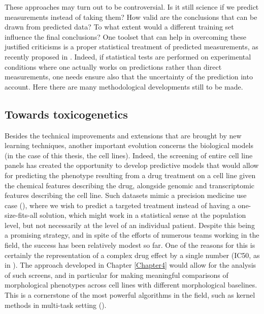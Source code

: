 These approaches may turn out to be controversial. Is it still science if we predict measurements instead of taking them? How valid are the conclusions that can be drawn from predicted data? To what extent would a different training set influence the final conclusions? One toolset that can help in overcoming these justified criticisms is a proper statistical treatment of predicted measurements, as recently proposed in \cite{whitehill2018automatic}. Indeed, if statistical tests are performed on experimental conditions where one actually works on predictions rather than direct measurements, one needs ensure also that the uncertainty of the prediction into account. Here there are many methodological developments still to be made.

\subsection{Towards toxicogenetics}

Besides the technical improvements and extensions that are brought by new learning techniques, another important evolution concerns the biological models (in the case of this thesis, the cell lines). Indeed, the screening of entire cell line panels has created the opportunity to develop predictive models that would allow for predicting the phenotype resulting from a drug treatment on a cell line given the chemical features describing the drug, alongside genomic and transcriptomic features describing the cell line. Such datasets mimic a precision medicine use case (\cite{eduati2015prediction, costello2014community}), where we wish to predict a targeted treatment instead of having a one-size-fits-all solution, which might work in a statistical sense at the population level, but not necessarily at the level of an individual patient. Despite this being a promising strategy, and in spite of the efforts of numerous teams working in the field, the success has been relatively modest so far. One of the reasons for this is certainly the representation of a complex drug effect by a single number (IC50, as in \cite{eduati2015prediction}). The approach developed in Chapter \ref{Chapter4} would allow for the analysis of such screens, and in particular for making meaningful comparisons of morphological phenotypes across cell lines with different morphological baselines. This is a cornerstone of the most powerful algorithms in the field, such as kernel methods in multi-task setting (\cite{playe2018efficient}).

